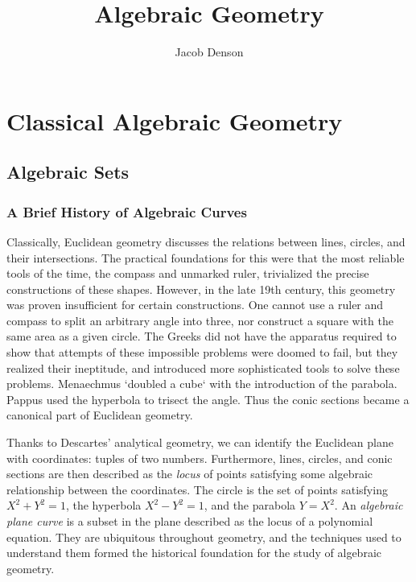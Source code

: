 

\title{Algebraic Geometry}
\author{Jacob Denson}



\maketitle
\tableofcontents
{}

\part{Classical Algebraic Geometry}

\chapter{Algebraic Sets}

\section{A Brief History of Algebraic Curves}

Classically, Euclidean geometry discusses the relations between lines, circles, and their intersections. The practical foundations for this were that the most reliable tools of the time, the compass and unmarked ruler, trivialized the precise constructions of these shapes. However, in the late 19th century, this geometry was proven insufficient for certain constructions. One cannot use a ruler and compass to split an arbitrary angle into three, nor construct a square with the same area as a given circle. The Greeks did not have the apparatus required to show that attempts of these impossible problems were doomed to fail, but they realized their ineptitude, and introduced more sophisticated tools to solve these problems. Menaechmus `doubled a cube` with the introduction of the parabola. Pappus used the hyperbola to trisect the angle. Thus the conic sections became a canonical part of Euclidean geometry.

Thanks to Descartes' analytical geometry, we can identify the Euclidean plane with coordinates: tuples of two numbers. Furthermore, lines, circles, and conic sections are then described as the {\it locus} of points satisfying some algebraic relationship between the coordinates. The circle is the set of points satisfying $X^2 + Y^2 = 1$, the hyperbola $X^2 - Y^2 = 1$, and the parabola $Y = X^2$. An \emph{algebraic plane curve} is a subset in the plane described as the locus of a polynomial equation. They are ubiquitous throughout geometry, and the techniques used to understand them formed the historical foundation for the study of algebraic geometry.


